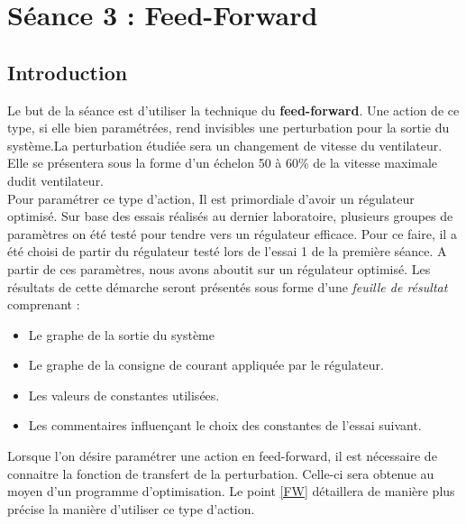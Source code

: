 \section{Séance 3 : Feed-Forward}
\subsection{Introduction}
Le but de la séance est d'utiliser la technique du \textbf{feed-forward}. Une action de ce type, si elle bien paramétrées, rend invisibles une perturbation pour la sortie du système.La perturbation étudiée sera un changement de vitesse du ventilateur. Elle se présentera sous la forme d'un échelon 50 à 60\% de la vitesse maximale dudit ventilateur.\\

Pour paramétrer ce type d'action, Il est primordiale d'avoir un régulateur optimisé. Sur base des essais réalisés au dernier laboratoire, plusieurs groupes de paramètres on été testé pour tendre vers un régulateur efficace. Pour ce faire, il a été choisi de partir du régulateur testé lors de l'essai 1 de la première séance. A partir de ces paramètres, nous avons aboutit sur un régulateur optimisé. Les résultats de cette démarche seront présentés sous forme d'une \textit{feuille de résultat} comprenant :
\begin{itemize}
\item Le graphe de la sortie du système 
\item Le graphe de la consigne de courant appliquée par le régulateur.
\item Les valeurs de constantes utilisées.
\item Les commentaires influençant le choix des constantes de l'essai suivant.
\end{itemize}

Lorsque l'on désire paramétrer une action en feed-forward, il est nécessaire de connaitre la fonction de transfert de la perturbation. Celle-ci sera obtenue au moyen d'un programme d'optimisation. Le point \ref{FW} détaillera de manière plus précise la manière d'utiliser ce type d'action.\\ 


